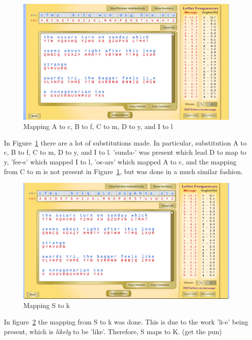 \documentclass[12pt]{article}
\begin{document}
\begin{figure}[H]
    \begin{center}
        \includegraphics[scale=0.48]{c12.png}
    \end{center}{}
    \caption{Mapping A to c, B to f, C to m, D to y, and I to l}
    \label{fig:c12}
\end{figure}

In Figure~\ref{fig:c12} there are a lot of substitutions made. In particular, substitution A to c, B to f, C to m, D to y, and I to l. 'sunda-' was present which lead D to map to y, 'fee-s' which mapped I to l, 'os-ars' which mapped A to c, and the mapping from C to m is not present in Figure~\ref{fig:c12}, but was done in a much similar fashion.

\begin{figure}[H]
    \begin{center}
        \includegraphics[scale=0.48]{c13.png}
    \end{center}{}
    \caption{Mapping S to k}
    \label{fig:c13}
\end{figure}

In figure~\ref{fig:c13} the mapping from S to k was done. This is due to the work 'li-e' being present, which is \emph{likely} to be 'like'. Therefore, S maps to K. (get the pun)
\end{document}
